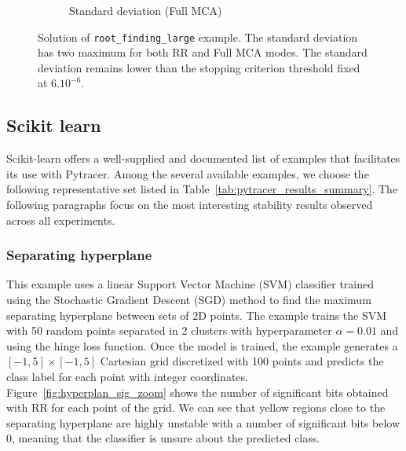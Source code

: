 \begin{figure}
\begin{subfigure}{0.45\linewidth}
        \caption{Standard deviation (Full MCA)}
        \label{fig:stdev_mca}
    \end{subfigure}
    \caption{Solution of \texttt{root\_finding\_large} example.
        The standard deviation has two maximum for both RR and Full MCA modes. The standard deviation remains lower than
        the stopping criterion threshold fixed at $6.10^{-6}$. }
    \label{fig:root_finding_large}
\end{figure}

\subsection{Scikit learn}
\label{sec:sklearn_tests}

Scikit-learn offers a well-supplied and documented list of examples that
facilitates its use with Pytracer. Among the several available examples, we
choose the following representative set listed in
Table~\ref{tab:pytracer_results_summary}. The following paragraphs focus on the
most interesting stability results observed across all experiments.

\subsubsection{Separating hyperplane}

This example uses a linear Support Vector Machine (SVM) classifier trained using
the Stochastic Gradient Descent (SGD) method to find the maximum separating
hyperplane between sets of 2D points. The example trains the SVM with 50 random
points separated in 2 clusters with hyperparameter $\alpha=0.01$ and using the
hinge loss function. Once the model is trained, the example generates a
$[-1,5]\times[-1,5]$ Cartesian grid discretized with 100 points and predicts the
class label for each point with integer coordinates.
Figure~\ref{fig:hyperplan_sig_zoom} shows the number of significant bits
obtained with RR for each point of the grid.
We can see that yellow regions
close to the separating hyperplane are highly unstable with a number of
significant bits below 0, meaning that the classifier is unsure about the
predicted class.



